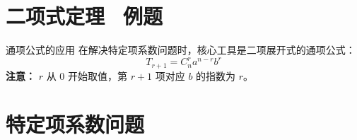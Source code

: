 \documentclass[11pt,a4paper]{article}
\newlength{\myspace}             %
\begin{document}
\section{二项式定理 \, 例题}



\begin{mybox}{通项公式的应用}
    在解决特定项系数问题时，核心工具是二项展开式的通项公式：
    \[ T_{r+1} = C_n^r a^{n-r} b^r \]
    \textbf{注意：} $r$ 从 $0$ 开始取值，第 $r+1$ 项对应 $b$ 的指数为 $r$。
\end{mybox}

\vspace{\myspace}

\section{特定项系数问题}
\end{document}
